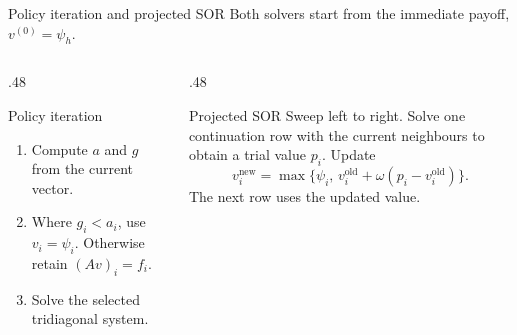 \documentclass[aspectratio=169,11pt]{beamer}
\begin{document}
\begin{frame}[t]{Policy iteration and projected SOR}
\small
Both solvers start from the immediate payoff, $v^{(0)}=\psi_h$.
\begin{columns}[T,onlytextwidth]
\begin{column}{.48\textwidth}
\begin{block}{Policy iteration}
\small
\begin{enumerate}
\item Compute $a$ and $g$ from the current vector.
\item Where $g_i<a_i$, use $v_i=\psi_i$.
      Otherwise retain $(Av)_i=f_i$.
\item Solve the selected tridiagonal system.
\end{enumerate}
\end{block}
\end{column}
\begin{column}{.48\textwidth}
\begin{block}{Projected SOR}
\small
Sweep left to right. Solve one continuation row with the current
neighbours to obtain a trial value $p_i$. Update
\[
v_i^{\mathrm{new}}=\max\{\psi_i,\,
    v_i^{\mathrm{old}}+\omega(p_i-v_i^{\mathrm{old}})\}.
\]
The next row uses the updated value.
\end{block}
\end{column}
\end{columns}
\end{frame}
\end{document}
